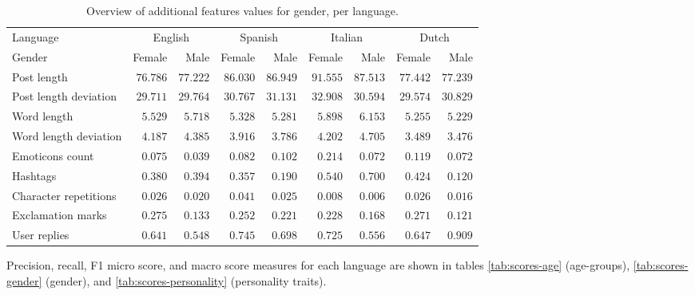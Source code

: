 \documentclass[10pt, a4paper]{article}
\begin{document}
\begin{table*}
\caption{Overview of additional features values for gender, per language.}
\label{tab:additionalfeatures-gender}
\begin{center}
\begin{tabular}{l|rr|rr|rr|rr}
\toprule
Language & \multicolumn{2}{|c|}{English} & \multicolumn{2}{|c}{Spanish} & \multicolumn{2}{|c}{Italian} & \multicolumn{2}{|c}{Dutch} \\
Gender & Female & Male & Female & Male & Female & Male & Female & Male \\
\midrule
Post length & $ 76.786 $ & $ 77.222 $ & $ 86.030 $ & $ 86.949 $ & $ 91.555 $ & $ 87.513 $ & $ 77.442 $ & $ 77.239 $ \\
Post length deviation & $ 29.711 $ & $ 29.764 $ & $ 30.767 $ & $ 31.131 $ & $ 32.908 $ & $ 30.594 $ & $ 29.574 $ & $ 30.829 $ \\
Word length & $ 5.529 $ & $ 5.718 $ & $ 5.328 $ & $ 5.281 $ & $ 5.898 $ & $ 6.153 $ & $ 5.255 $ & $ 5.229 $ \\
Word length deviation & $ 4.187 $ & $ 4.385 $ & $ 3.916 $ & $ 3.786 $ & $ 4.202 $ & $ 4.705 $ & $ 3.489 $ & $ 3.476 $ \\
Emoticons count & $ 0.075 $ & $ 0.039 $ & $ 0.082 $ & $ 0.102 $ & $ 0.214 $ & $ 0.072 $ & $ 0.119 $ & $ 0.072 $ \\
Hashtags &  $ 0.380 $ & $ 0.394 $ & $ 0.357 $ & $ 0.190 $ & $ 0.540 $ & $ 0.700 $ & $ 0.424 $ & $ 0.120 $ \\
Character repetitions & $ 0.026 $ & $ 0.020 $ & $ 0.041 $ & $ 0.025 $ & $ 0.008 $ & $ 0.006 $ & $ 0.026 $ & $ 0.016 $ \\
Exclamation marks & $ 0.275 $ & $ 0.133 $ & $ 0.252 $ & $ 0.221 $ & $ 0.228 $ & $ 0.168 $ & $ 0.271 $ & $ 0.121 $ \\
User replies & $ 0.641 $ & $ 0.548 $ & $ 0.745 $ & $ 0.698 $ & $ 0.725 $ & $ 0.556 $ & $ 0.647 $ & $ 0.909 $ \\
\bottomrule
\end{tabular}
\end{center}
\end{table*}

Precision, recall, F1 micro score, and macro score measures for each language are shown in tables \ref{tab:scores-age} (age-groups), \ref{tab:scores-gender} (gender), and \ref{tab:scores-personality} (personality traits).
\end{document}
